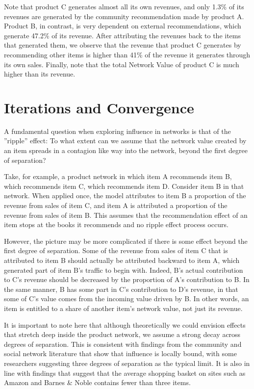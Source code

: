 Note that product C generates almost all its own revenues, and only 1.3\% of its revenues are generated by the community recommendation made by product A. Product B, in contrast, is very dependent on external recommendations, which generate 47.2\% of its revenue. After attributing the revenues back to the items that generated them, we observe that the revenue that product C generates by recommending other items is higher than 41\% of the revenue it generates through its own sales. Finally, note that the total Network Value of product C is much higher than its revenue.



\section{Iterations and Convergence}

A fundamental question when exploring influence in networks is that of the ”ripple” effect: To what extent can we assume that the network value created by an item spreads in a contagion like way into the network, beyond the first degree of separation?

Take, for example, a product network in which item A recommends item B, which recommends item C, which recommends item D. Consider item B in that network. When applied once, the model attributes to item B a proportion of the revenue from sales of item C, and item A is attributed a proportion of the revenue from sales of item B. This assumes that the recommendation effect of an item stops at the books it recommends and no ripple effect process occurs.

However, the picture may be more complicated if there is some effect beyond the first degree of separation. Some of the revenue from sales of item C that is attributed to item B should actually be attributed backward to item A, which generated part of item B’s traffic to begin with. Indeed, B’s actual contribution to C’s revenue should be decreased by the proportion of A’s contribution to B. In the same manner, B has some part in C’s contribution to D’s revenue, in that some of C’s value comes from the incoming value driven by B. In other words, an item is entitled to a share of another item’s network value, not just its revenue.

It is important to note here that although theoretically we could envision effects that stretch deep inside the product network, we assume a strong decay across degrees of separation. This is consistent with findings from the community and social network literature that show that influence is locally bound, with some researchers suggesting three degrees of separation as the typical limit. It is also in line with findings that suggest that the average shopping basket on sites such as Amazon and Barnes \& Noble contains fewer than three items.

